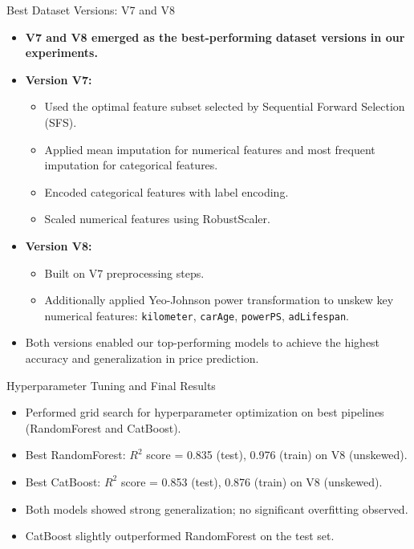 \documentclass{beamer}
\begin{document}
\begin{frame}{Best Dataset Versions: V7 and V8}
    \begin{itemize}
        \item \textbf{V7 and V8 emerged as the best-performing dataset versions in our experiments.}
        \item \textbf{Version V7:}
        \begin{itemize}
            \item Used the optimal feature subset selected by Sequential Forward Selection (SFS).
            \item Applied mean imputation for numerical features and most frequent imputation for categorical features.
            \item Encoded categorical features with label encoding.
            \item Scaled numerical features using RobustScaler.
        \end{itemize}
        \item \textbf{Version V8:}
        \begin{itemize}
            \item Built on V7 preprocessing steps.
            \item Additionally applied Yeo-Johnson power transformation to unskew key numerical features: \texttt{kilometer}, \texttt{carAge}, \texttt{powerPS}, \texttt{adLifespan}.
        \end{itemize}
        \item Both versions enabled our top-performing models to achieve the highest accuracy and generalization in price prediction.
    \end{itemize}
\end{frame}

\begin{frame}{Hyperparameter Tuning and Final Results}
    \begin{itemize}
        \item Performed grid search for hyperparameter optimization on best pipelines (RandomForest and CatBoost).
        \item Best RandomForest: $R^2$ score = 0.835 (test), 0.976 (train) on V8 (unskewed).
        \item Best CatBoost: $R^2$ score = 0.853 (test), 0.876 (train) on V8 (unskewed).
        \item Both models showed strong generalization; no significant overfitting observed.
        \item CatBoost slightly outperformed RandomForest on the test set.
    \end{itemize}
\end{frame}
\end{document}
